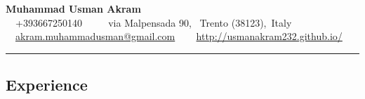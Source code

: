 \documentclass[10pt,letterpaper]{article}
\begin{document}
\begin{center}
{\LARGE \textbf{Muhammad Usman Akram}} \\
\ \ +393667250140 \ \ \textbullet
\ \ via Malpensada 90, \ Trento (38123),\ Italy
\\
\ \ \href{mailto:akram.muhammadusman@gmail.com}{akram.muhammadusman@gmail.com}
\ \textbullet
\ \ \href{http://usmanakram232.github.io/}{http://usmanakram232.github.io/}
\end{center}

\hrule
\vspace{-0.4em}
\subsection*{Experience}
\end{document}
